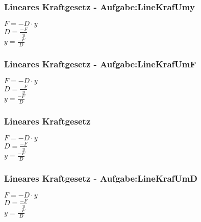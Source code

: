 \subsubsection{Lineares Kraftgesetz - Aufgabe:LineKrafUmy} 
\begin{minipage}{0.45\textwidth} 
$ F = -D\cdot y $\\ 
$ D = \frac{-F}{y} $\\ 
$ y = \frac{-F}{D} $\\ 
\end{minipage} 
\begin{minipage}{0.45\textwidth} 
 
\end{minipage} 
\subsubsection{Lineares Kraftgesetz - Aufgabe:LineKrafUmF} 
\begin{minipage}{0.45\textwidth} 
$ F = -D\cdot y $\\ 
$ D = \frac{-F}{y} $\\ 
$ y = \frac{-F}{D} $\\ 
\end{minipage} 
\begin{minipage}{0.45\textwidth} 
 
\end{minipage} 
\subsubsection{Lineares Kraftgesetz} 
\begin{minipage}{0.45\textwidth} 
$ F = -D\cdot y $\\ 
$ D = \frac{-F}{y} $\\ 
$ y = \frac{-F}{D} $\\ 
\end{minipage} 
\begin{minipage}{0.45\textwidth} 
 
\end{minipage} 
\subsubsection{Lineares Kraftgesetz - Aufgabe:LineKrafUmD} 
\begin{minipage}{0.45\textwidth} 
$ F = -D\cdot y $\\ 
$ D = \frac{-F}{y} $\\ 
$ y = \frac{-F}{D} $\\ 
\end{minipage} 
\begin{minipage}{0.45\textwidth} 
 
\end{minipage} 
